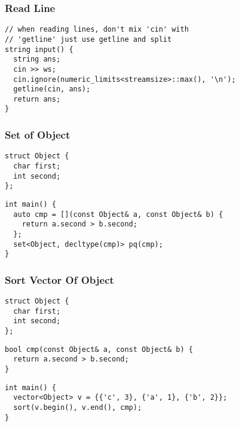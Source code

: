 \documentclass[twoside]{article}
\begin{document}
\begin{multicols*}{2}
\subsubsectionfont{\large\bfseries\sffamily\underline}
\subsubsection*{Read Line}
\begin{verbatim}
// when reading lines, don't mix 'cin' with
// 'getline' just use getline and split
string input() {
  string ans;
  cin >> ws;
  cin.ignore(numeric_limits<streamsize>::max(), '\n');
  getline(cin, ans);
  return ans;
}
\end{verbatim}

\subsubsectionfont{\large\bfseries\sffamily\underline}
\subsubsection*{Set of Object}
\begin{verbatim}
struct Object {
  char first;
  int second;
};
\end{verbatim}
\vspace{-12pt}
\begin{verbatim}
int main() {
  auto cmp = [](const Object& a, const Object& b) {
    return a.second > b.second;
  };
  set<Object, decltype(cmp)> pq(cmp);
}
\end{verbatim}

\subsubsectionfont{\large\bfseries\sffamily\underline}
\subsubsection*{Sort Vector Of Object}
\begin{verbatim}
struct Object {
  char first;
  int second;
};
\end{verbatim}
\vspace{-12pt}
\begin{verbatim}
bool cmp(const Object& a, const Object& b) {
  return a.second > b.second;
}
\end{verbatim}
\vspace{-12pt}
\begin{verbatim}
int main() {
  vector<Object> v = {{'c', 3}, {'a', 1}, {'b', 2}};
  sort(v.begin(), v.end(), cmp);
}
\end{verbatim}


\end{multicols*}
\end{document}

